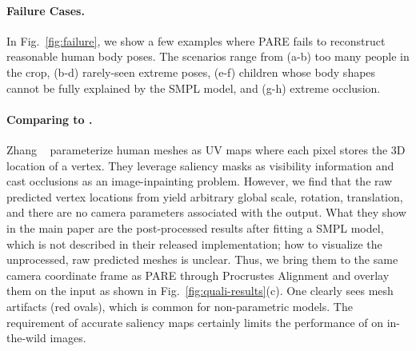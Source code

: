 \documentclass[10pt,twocolumn,letterpaper,usenames,dvipsnames]{article}
\newcommand{\methodname}{PARE\xspace}
\begin{document}
\paragraph{Failure Cases.}
In Fig.~\ref{fig:failure}, we show a few examples where \methodname fails to reconstruct reasonable human body poses. The scenarios range from (a-b) too many people in the crop, (b-d) rarely-seen extreme poses, (e-f) children whose body shapes cannot be fully explained by the SMPL model, and (g-h) extreme occlusion.

\paragraph{Comparing to \cite{zhangoohcvpr20}.}
Zhang \etal~\cite{zhangoohcvpr20} parameterize human meshes as UV maps where each pixel stores the 3D location of a vertex.
They leverage saliency masks as visibility information and cast occlusions as an image-inpainting problem. 
However, we find that the raw predicted vertex locations from \cite{zhangoohcvpr20} yield arbitrary global scale, rotation, translation, and there are no camera parameters associated with the output. 
What they show in the main paper are the post-processed results after fitting a SMPL model, which is not described in their released implementation;  how to visualize the unprocessed, raw predicted meshes is unclear.
Thus, we bring them to the same camera coordinate frame as \methodname through Procrustes Alignment and overlay them on the input as shown in Fig.~\ref{fig:quali-results}(c).
One clearly sees mesh artifacts (red ovals), which is common for non-parametric models. 
The requirement of accurate saliency maps certainly limits the performance of \cite{zhangoohcvpr20} on in-the-wild images.
\end{document}
